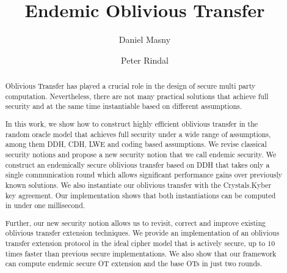 \documentclass[10pt]{article}
\title{Endemic Oblivious Transfer}
\author{Daniel Masny \and Peter Rindal}
\institute{VISA Research}
\begin{document}
\maketitle

\begin{abstract}
Oblivious Transfer has played a crucial role in the design of secure multi party computation. Nevertheless, there are not many practical solutions that achieve full security and at the same time instantiable based on different assumptions.

In this work, we show how to construct highly efficient oblivious transfer in the random oracle model that achieves full security under a wide range of assumptions, among them DDH, CDH, LWE and coding based assumptions. We revise classical security notions and propose a new security notion that we call endemic security. We construct an endemically secure oblivious transfer based on DDH that takes only a single communication round which allows significant performance gains over previously known solutions. We also instantiate our oblivious transfer with the Crystals.Kyber key agreement. Our implementation shows that both instantiations can be computed in under one millisecond. 

Further, our new security notion allows us to revisit, correct and improve existing oblivious transfer extension techniques. We provide an implementation of an oblivious transfer extension protocol in the ideal cipher model that is actively secure, up to $10$ times faster than previous secure implementations. We also show that our framework can compute endemic secure OT extension and the base OTs in just two rounds.

\end{abstract}









% 






\appendix




%



%
\end{document}
